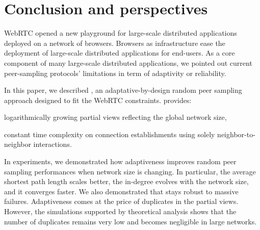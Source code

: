 
\section{Conclusion and perspectives}
\label{sec:conclusion}


WebRTC opened a new playground for large-scale distributed applications
deployed on a network of browsers. Browsers as infrastructure ease the
deployment of large-scale distributed applications for end-users. As a core
component of many large-scale distributed applications, we pointed out current
peer-sampling protocols' limitations in term of adaptivity or reliability.

In this paper, we described \SPRAY, an adaptative-by-design random peer
sampling approach designed to fit the WebRTC constraints.  \SPRAY provides:
\begin{inparaenum}[(i)]
\item logarithmically growing partial views reflecting the global network size,
\item constant time complexity on connection establishments using solely
  neighbor-to-neighbor interactions.
\end{inparaenum}


In experiments, we demonstrated how \SPRAY adaptiveness improves random peer
sampling performances when network size is changing. In particular, the average
shortest path length scales better, the in-degree evolves with the network size,
and it converges faster.  We also demonstrated that \SPRAY stays robust to
massive failures. Adaptiveness comes at the price of duplicates in the partial
views. However, the simulations supported by theoretical analysis shows that the
number of duplicates remains very low and becomes negligible in large networks.




